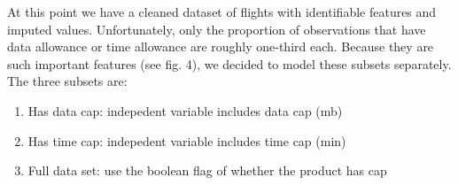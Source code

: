 \documentclass[]{article}
\providecommand{\tightlist}{%
  \setlength{\itemsep}{0pt}\setlength{\parskip}{0pt}}
\begin{document}
At this point we have a cleaned dataset of flights with identifiable
features and imputed values. Unfortunately, only the proportion of
observations that have data allowance or time allowance are roughly
one-third each. Because they are such important features (see fig. 4),
we decided to model these subsets separately. The three subsets are:

\begin{enumerate}
\def\labelenumi{\arabic{enumi}.}
\tightlist
\item
  Has data cap: indepedent variable includes data cap (mb)
\item
  Has time cap: indepedent variable includes time cap (min)
\item
  Full data set: use the boolean flag of whether the product has cap
\end{enumerate}
\end{document}
